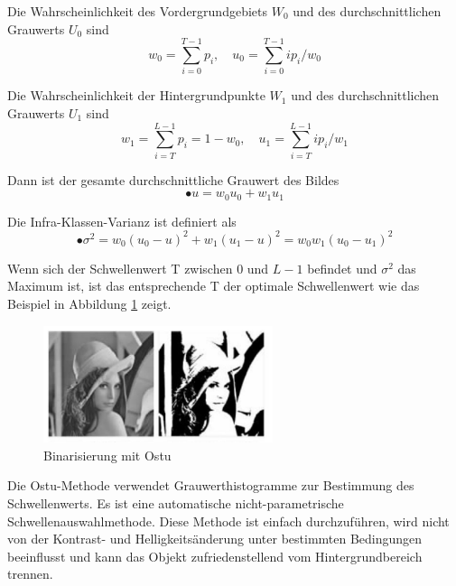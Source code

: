 Die Wahrscheinlichkeit des Vordergrundgebiets $ W_{0} $ und des durchschnittlichen Grauwerts $ U_{0} $ sind
\begin{equation}
  w_{0} = \sum_{i=0}^{T-1} p_{i},\quad u_{0} = \sum_{i=0}^{T-1} ip_{i}/w_{0}
\end{equation}

Die Wahrscheinlichkeit der Hintergrundpunkte $ W_{1} $ und des durchschnittlichen Grauwerts $ U_{1} $ sind
\begin{equation}
  w_{1} = \sum_{i=T}^{L-1} p_{i} = 1-w_{0},\quad u_{1} = \sum_{i=T}^{L-1} ip_{i}/w_{1}
\end{equation}

Dann ist der gesamte durchschnittliche Grauwert des Bildes
\begin{equation}
• u = w_{0}u_{0} + w_{1}u_{1}
\end{equation}

Die Infra-Klassen-Varianz ist definiert als
\begin{equation}
•\sigma^2 = w_{0}(u_{0} - u)^2 + w_{1}(u_{1} - u)^2 = w_{0}w_{1}(u_{0} - u_{1})^2
\end{equation}

Wenn sich der Schwellenwert T zwischen 0 und $ L-1 $ befindet und $ \sigma^2 $ das Maximum ist, ist das entsprechende T der optimale Schwellenwert wie das Beispiel in Abbildung \ref{fig:Binarisierung mit globalen Schwellenwertmethode} zeigt.

\begin{figure}[H]
 \centering 
  \includegraphics[keepaspectratio,width=0.6\textwidth]{images/4_ZweiteErfahrung/Binar/Ostu.pdf}
 \caption{Binarisierung mit Ostu}
 \label{fig:Binarisierung mit globalen Schwellenwertmethode}
\end{figure} 

Die Ostu-Methode verwendet Grauwerthistogramme zur Bestimmung des Schwellenwerts. Es ist eine automatische nicht-parametrische Schwellenauswahlmethode. Diese Methode ist einfach durchzuführen, wird nicht von der Kontrast- und Helligkeitsänderung unter bestimmten Bedingungen beeinflusst und kann das Objekt zufriedenstellend vom Hintergrundbereich trennen.

